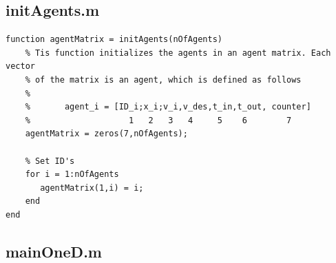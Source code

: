 \documentclass[11pt]{article}
\begin{document}
\subsection*{initAgents.m}
\begin{lstlisting}[frame=lines]
function agentMatrix = initAgents(nOfAgents)
    % Tis function initializes the agents in an agent matrix. Each vector
    % of the matrix is an agent, which is defined as follows
    %
    %       agent_i = [ID_i;x_i;v_i,v_des,t_in,t_out, counter]
    %                    1   2   3   4     5    6        7
    agentMatrix = zeros(7,nOfAgents);
    
    % Set ID's
    for i = 1:nOfAgents
       agentMatrix(1,i) = i; 
    end
end
\end{lstlisting}

\subsection*{mainOneD.m}
\end{document}
